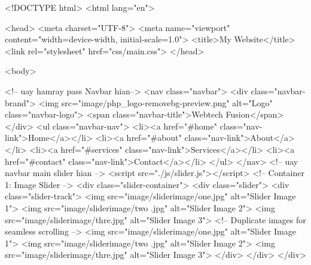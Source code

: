 

<!DOCTYPE html>
<html lang="en">

<head>
    <meta charset="UTF-8">
    <meta name="viewport" content="width=device-width, initial-scale=1.0">
    <title>My Website</title>
    <link rel="stylesheet" href="css/main.css">
</head>

<body>


    <!-- uay hamray pass Navbar hian-->
    <nav class="navbar">
        <div class="navbar-brand">
            <img src="image/php_logo-removebg-preview.png" alt="Logo" class="navbar-logo">
            <span class="navbar-title">Webtech Fusion</span>
        </div>
        <ul class="navbar-nav">
            <li><a href="#home" class="nav-link">Home</a></li>
            <li><a href="#about" class="nav-link">About</a></li>
            <li><a href="#services" class="nav-link">Services</a></li>
            <li><a href="#contact" class="nav-link">Contact</a></li>
        </ul>
    </nav>
    <!-- uay navbar main slider hian -->
    <script src="./js/slider.js"></script>
    <!-- Container 1: Image Slider -->
    <div class="slider-container">
        <div class="slider">
            <div class="slider-track">
                <img src="image/sliderimage/one.jpg" alt="Slider Image 1">
                <img src="image/sliderimage/two .jpg" alt="Slider Image 2">
                <img src="image/sliderimage/thre.jpg" alt="Slider Image 3">
                <!-- Duplicate images for seamless scrolling -->
                <img src="image/sliderimage/one.jpg" alt="Slider Image 1">
                <img src="image/sliderimage/two .jpg" alt="Slider Image 2">
                <img src="image/sliderimage/thre.jpg" alt="Slider Image 3">
            </div>
        </div>
    </div>



